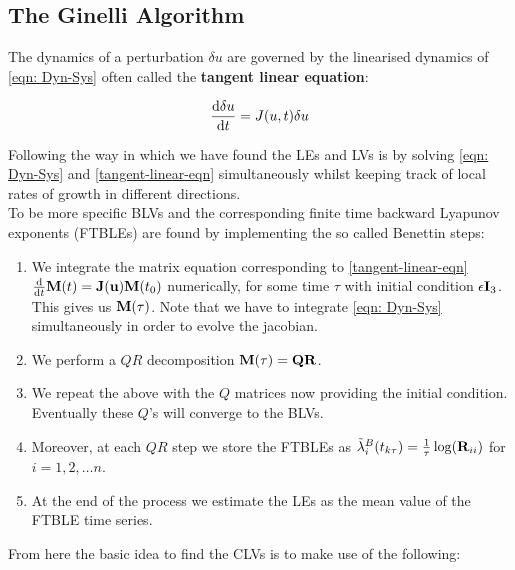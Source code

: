 \subsection{The Ginelli Algorithm} \label{section: Ginelli-Alg}

The dynamics of a perturbation $\delta u$ are governed by the linearised dynamics of \ref{eqn: Dyn-Sys} often called the \textbf{tangent linear equation}:

\begin{align}
\dv{\delta u}{t} = J(u, t) \delta u \label{tangent-linear-eqn}
\end{align}

Following \cite{Ginelli2007} the way in which we have found the LEs and LVs is by solving \ref{eqn: Dyn-Sys} and \ref{tangent-linear-eqn} simultaneously whilst keeping track of local rates of growth in different directions.\\

To be more specific BLVs and the corresponding finite time backward Lyapunov exponents (FTBLEs) are found by implementing the so called Benettin steps:


\begin{enumerate}
\item We integrate the matrix equation corresponding to \ref{tangent-linear-eqn} $\dv{}{t} \vb{M}(t) = \vb{J}(\vb{u}) \vb{M}(t_0)$ numerically, for some time $\tau$ with initial condition $\epsilon \vb{I} _3$. This gives us $\vb{M}(\tau)$. Note that we have to integrate \ref{eqn: Dyn-Sys} simultaneously in order to evolve the jacobian.
\item We perform a $QR$ decomposition $\vb{M}(\tau) = \vb{QR}$.
\item We repeat the above with the $Q$ matrices now providing the initial condition. Eventually these $Q$'s will converge to the BLVs.
\item Moreover, at each $QR$ step we store the FTBLEs as $\tilde{\lambda}_i ^B (t_{k \tau})= \frac{1}{\tau} \log(\vb{R}_{ii})$ for $i = 1, 2, \ldots n$.
\item At the end of the process we estimate the LEs as the mean value of the FTBLE time series.
\setcounter{algo}{\value{enumi}}
\end{enumerate}

From here the basic idea to find the CLVs is to make use of the following:

